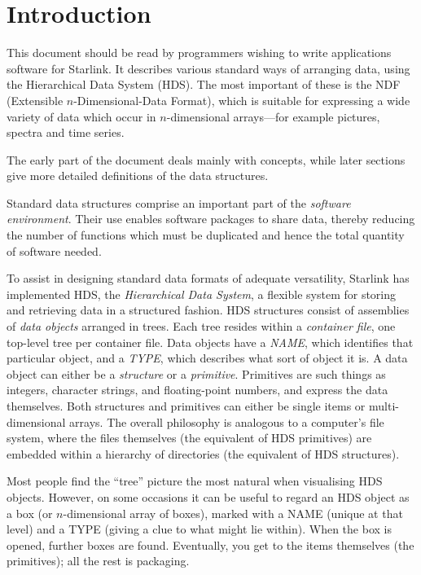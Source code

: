 \documentclass[twoside,11pt,nolof,noabs]{starlink}
\begin{document}
\scfrontmatter

\section{Introduction}
\label{se:intro}

This document should be read by programmers wishing to write
applications software for Starlink.  It describes various
standard ways of arranging data, using the Hierarchical
Data System (HDS).  The most important of these is the NDF
(Extensible $n$-Dimensional-Data Format), which is suitable for
expressing a wide variety of data which occur in $n$-dimensional
arrays---for example pictures, spectra and time series.

The early part of the document deals mainly with
concepts, while later sections give more detailed
definitions of the data structures.

Standard data structures comprise an important part of the
\textit{software environment}.
Their use enables software packages to share data, thereby
reducing the number of functions which must be
duplicated and hence
the total quantity of software needed.

To assist in designing standard data formats of adequate
versatility, Starlink has implemented HDS, the
\textit{Hierarchical Data System},
a flexible system for storing and retrieving data in a
structured fashion.
HDS structures consist of assemblies of
\textit{data objects}
arranged in trees.  Each tree resides within a
\textit{container file},
one top-level tree per container file.
Data objects have a
\textit{NAME},
which identifies that particular object, and a
\textit{TYPE},
which describes what sort of object it is.
A data object can either be a
\textit{structure}
or a
\textit{primitive}.
Primitives are such things as integers,
character strings, and floating-point numbers, and express the
data themselves.  Both structures and primitives can
either be single items or multi-dimensional arrays.  The overall
philosophy is analogous to a computer's file system, where
the files themselves (the equivalent of HDS primitives)
are embedded within a hierarchy of directories (the equivalent
of HDS structures).

Most people find the ``tree'' picture the most natural when
visualising HDS objects.  However, on some occasions it can
be useful to regard an HDS object as a box (or $n$-dimensional
array of boxes), marked with a NAME (unique at that level)
and a TYPE (giving a clue to what might lie within).  When
the box is opened, further boxes are found.  Eventually,
you get to the items themselves (the primitives);  all the
rest is packaging.
\end{document}
